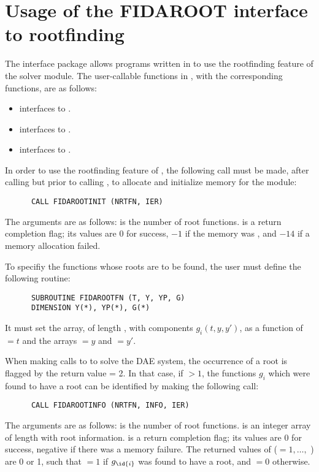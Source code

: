 \section{Usage of the FIDAROOT interface to rootfinding}

The {\fidaroot} interface package allows programs written in {\F} to
use the rootfinding feature of the {\ida} solver module.
The user-callable functions in {\fidaroot}, with the corresponding
{\ida} functions, are as follows: 
\begin{itemize}
  \item {} interfaces to .
  \item {} interfaces to .
  \item {} interfaces to .
\end{itemize}
In order to use the rootfinding feature of {\ida}, the following call must
be made, after calling  but prior to calling ,
to allocate and initialize memory for the  module:
\begin{verbatim}
      CALL FIDAROOTINIT (NRTFN, IER)
\end{verbatim}
The arguments are as follows:
 is the number of root functions.
 is a return completion flag; its values are $0$ for success, $-1$ 
if the  memory was , and $-14$ if a memory allocation failed.

To specifiy the functions whose roots are to be found, the user must
define the following routine:
\begin{verbatim}
      SUBROUTINE FIDAROOTFN (T, Y, YP, G)
      DIMENSION Y(*), YP(*), G(*)
\end{verbatim}
It must set the  array, of length , with components
$g_i(t,y,y')$, as a function of  $= t$ and the arrays  $= y$
and  $= y'$.

When making calls to  to solve the DAE system, the occurrence
of a root is flagged by the return value  = 2.  In that case, if
 $> 1$, the functions $g_i$ which were found to have a root can
be identified by making the following call:
\begin{verbatim}
      CALL FIDAROOTINFO (NRTFN, INFO, IER)
\end{verbatim}
The arguments are as follows:  is the number of root functions.
 is an integer array of length  with root information.
 is a return completion flag; its values are $0$ for success, 
negative if there was a memory failure.  The returned values of 
($ = 1,\ldots,$ ) are 0 or 1, such that  $ = 1$
if $g_{\id{i}}$ was found to have a root, and  $ = 0$ otherwise.

